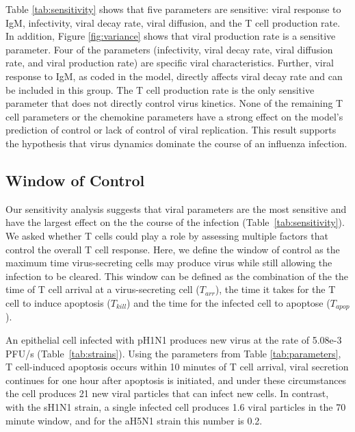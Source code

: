 \documentclass[10pt]{article}
\begin{document}
Table \ref{tab:sensitivity} shows that five parameters are sensitive: viral response to IgM, infectivity, viral decay rate, viral diffusion, and the T cell production rate.  In addition, Figure \ref{fig:variance} shows that viral production rate is a sensitive parameter.  Four of the parameters (infectivity, viral decay rate, viral diffusion rate, and viral production rate) are specific viral characteristics.  Further, viral response to IgM, as coded in the model, directly affects viral decay rate and can be included in this group.  The T cell production rate is the only sensitive parameter that does not directly control virus kinetics.  None of the remaining T cell parameters or the chemokine parameters have a strong effect on the model's prediction of control or lack of control of viral replication.  This result supports the hypothesis that virus dynamics dominate the course of an influenza infection.  


\subsection*{Window of Control}

Our sensitivity analysis suggests that viral parameters are the most sensitive and have the largest effect on the the course of the infection (Table~\ref{tab:sensitivity}).  We asked whether T cells could play a role by assessing multiple factors that control the overall T cell response.  Here, we define the window of control as the maximum time virus-secreting cells may produce virus while still allowing the infection to be cleared.  This window can be defined as the combination of the the time of T cell arrival at a virus-secreting cell ($T_{arr}$), the time it takes for the T cell to induce apoptosis ($T_{kill}$) and the time for the infected cell to apoptose ($T_{apop}$).

An epithelial cell infected with pH1N1 produces new virus at the rate of 5.08e-3 PFU/s (Table~\ref{tab:strains}).  Using the parameters from Table \ref{tab:parameters}, T cell-induced apoptosis occurs within 10 minutes of T cell arrival, viral secretion continues for one hour after apoptosis is initiated, and under these circumstances the cell produces 21 new viral particles that can infect new cells.  In contrast, with the sH1N1 strain, a single infected cell produces 1.6 viral particles in the 70 minute window, and for the aH5N1 strain this number is 0.2.  %
\end{document}
